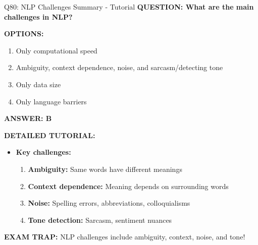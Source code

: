 \documentclass[8pt]{beamer}
\begin{document}
	\begin{frame}{Q80: NLP Challenges Summary - Tutorial}
		\fontsize{6.5}{7.5}\selectfont
		\textbf{QUESTION: What are the main challenges in NLP?}
		
		\vspace{0.1cm}
		\textbf{OPTIONS:}
		\begin{enumerate}
			\item Only computational speed
			\item Ambiguity, context dependence, noise, and sarcasm/detecting tone
			\item Only data size
			\item Only language barriers
		\end{enumerate}
		
		\vspace{0.1cm}
		\textcolor{myblue}{\textbf{ANSWER: B}}
		
		\vspace{0.1cm}
		\textbf{DETAILED TUTORIAL:}
		\begin{itemize}
			\item \textbf{Key challenges:}
			\begin{enumerate}
				\item \textbf{Ambiguity:} Same words have different meanings
				\item \textbf{Context dependence:} Meaning depends on surrounding words
				\item \textbf{Noise:} Spelling errors, abbreviations, colloquialisms
				\item \textbf{Tone detection:} Sarcasm, sentiment nuances
			\end{enumerate}
		\end{itemize}
		
		\textcolor{myred}{\textbf{EXAM TRAP:}} NLP challenges include \textcolor{myblue}{ambiguity, context, noise, and tone}!
	\end{frame}
	
	
\end{document}
